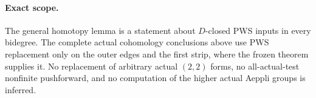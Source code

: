 \paragraph{Exact scope.}
The general homotopy lemma is a statement about $D$-closed
PWS inputs in every bidegree.  The complete actual cohomology
conclusions above use PWS replacement only on the outer
edges and the first strip, where the frozen theorem supplies
it.  No replacement of arbitrary actual $(2,2)$ forms, no
all-actual-test nonfinite pushforward, and no computation of
the higher actual Aeppli groups is inferred.
